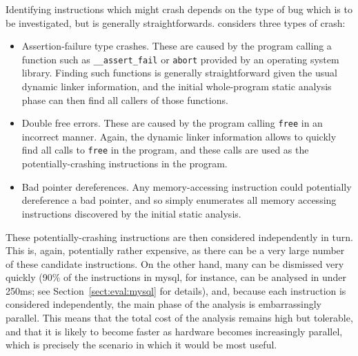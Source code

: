 Identifying instructions which might crash depends on the type of bug
which is to be investigated, but is generally straightforwards.
{\Implementation} considers three types of crash:

\begin{itemize}
\item Assertion-failure type crashes.  These are caused by the program
  calling a function such as \verb|__assert_fail| or \verb|abort|
  provided by an operating system library.  Finding such functions is
  generally straightforward given the usual dynamic linker
  information, and the initial whole-program static analysis phase can
  then find all callers of those functions.
\item Double free errors.  These are caused by the program calling
  \verb|free| in an incorrect manner.  Again, the dynamic linker
  information allows {\implementation} to quickly find all calls to
  \verb|free| in the program, and these calls are used as the
  potentially-crashing instructions in the program.
\item Bad pointer dereferences.  Any memory-accessing instruction
  could potentially dereference a bad pointer, and so
  {\implementation} simply enumerates all memory accessing
  instructions discovered by the initial static analysis.
\end{itemize}

These potentially-crashing instructions are then considered
independently in turn.  This is, again, potentially rather expensive,
as there can be a very large number of these candidate instructions.
On the other hand, many can be dismissed very quickly (90\% of the
instructions in mysql, for instance, can be analysed in under 250ms;
see Section~\ref{sect:eval:mysql} for details), and, because each
instruction is considered independently, the main phase of the
analysis is embarrassingly parallel.  This means that the total cost
of the analysis remains high but tolerable, and that it is likely to
become faster as hardware becomes increasingly parallel, which is
precisely the scenario in which it would be most useful.

